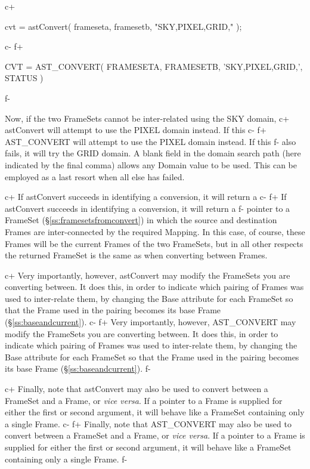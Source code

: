 \documentclass[twoside,11pt]{starlink}
\providecommand{\secref}[1]{\S\ref{#1}}
\begin{document}
{c+
\small
\begin{terminalv}
cvt = astConvert( frameseta, framesetb, "SKY,PIXEL,GRID," );
\end{terminalv}
\normalsize
c-
f+
\small
\begin{terminalv}
      CVT = AST_CONVERT( FRAMESETA, FRAMESETB, 'SKY,PIXEL,GRID,', STATUS )
\end{terminalv}
\normalsize
f-

Now, if the two FrameSets cannot be inter-related using the SKY domain,
c+
astConvert will attempt to use the PIXEL domain instead. If this
c-
f+
AST\_CONVERT will attempt to use the PIXEL domain instead. If this
f-
also fails, it will try the GRID domain. A blank field in the domain
search path (here indicated by the final comma) allows any Domain
value to be used. This can be employed as a last resort when all else
has failed.

c+
If astConvert succeeds in identifying a conversion, it will return a
c-
f+
If astConvert succeeds in identifying a conversion, it will return a
f-
pointer to a FrameSet (\secref{ss:framesetsfromconvert}) in which the
source and destination Frames are inter-connected by the required
Mapping. In this case, of course, these Frames will be the current
Frames of the two FrameSets, but in all other respects the returned
FrameSet is the same as when converting between Frames.

c+
Very importantly, however, astConvert may modify the FrameSets you are
converting between. It does this, in order to indicate which pairing
of Frames was used to inter-relate them, by changing the Base
attribute for each FrameSet so that the Frame used in the pairing
becomes its base Frame (\secref{ss:baseandcurrent}).
c-
f+
Very importantly, however, AST\_CONVERT may modify the FrameSets you
are converting between. It does this, in order to indicate which
pairing of Frames was used to inter-relate them, by changing the Base
attribute for each FrameSet so that the Frame used in the pairing
becomes its base Frame (\secref{ss:baseandcurrent}).
f-

c+
Finally, note that astConvert may also be used to convert between a
FrameSet and a Frame, or \emph{vice versa}. If a pointer to a Frame is
supplied for either the first or second argument, it will behave like
a FrameSet containing only a single Frame.
c-
f+
Finally, note that AST\_CONVERT may also be used to convert between a
FrameSet and a Frame, or \emph{vice versa}. If a pointer to a Frame is
supplied for either the first or second argument, it will behave like
a FrameSet containing only a single Frame.
f-

}
\end{document}
